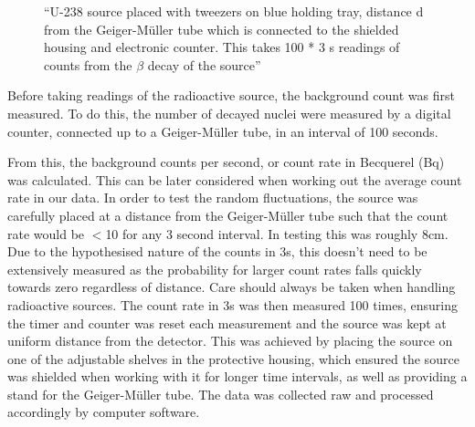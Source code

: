 \documentclass[11pt]{article}
\begin{document}
    \begin{figure}[ht]
        \begin{center}
            \def\svgwidth{\columnwidth}
            
             \caption{“U-238 source placed with tweezers on blue holding tray, distance d from the Geiger-Müller tube which is connected to the shielded housing and electronic counter. This takes 100 * 3 s readings of counts from the $\beta$ decay of the source”}
             \label{fig:experimental setup}
        \end{center}
    \end{figure}

    Before taking readings of the radioactive source, the background count was first measured. To do this, the number of decayed nuclei were measured by a digital counter, connected up to a Geiger-Müller tube, in an interval of 100 seconds.
    
    From this, the background counts per second, or count rate in Becquerel (Bq) was calculated. This can be later considered when working out the average count rate in our data. 
    \newline
    In order to test the random fluctuations, the  source was carefully placed at a distance from the Geiger-Müller tube such that the count rate would be $<$10 for any 3 second interval. In testing this was roughly 8cm. Due to the hypothesised nature of the counts in 3s, this doesn't need to be extensively measured as the probability for larger count rates falls quickly towards zero regardless of distance. Care should always be taken when handling radioactive sources. 
    \newline
    The count rate in 3s was then measured 100 times, ensuring the timer and counter was reset each measurement and the source was kept at uniform distance from the detector. This was achieved by placing the source on one of the adjustable shelves in the protective housing, which ensured the source was shielded when working with it for longer time intervals, as well as providing a stand for the Geiger-Müller tube. The data was collected raw and processed accordingly by computer software. 
    \newline 
    
\end{document}
